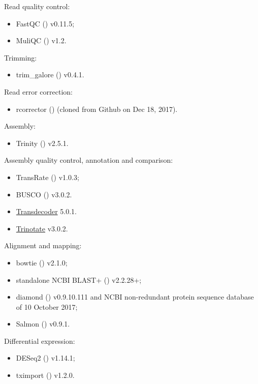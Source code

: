 \documentclass[12pt]{article}
\begin{document}
\noindent Read quality control: 
\begin{itemize}
\item FastQC (\cite{FastQC}) v0.11.5;
\item MuliQC (\cite{MultiQC}) v1.2.
\end{itemize}

\noindent Trimming:
\begin{itemize}
\item trim\_galore (\cite{trim_galore}) v0.4.1.
\end{itemize}

\noindent Read error correction:
\begin{itemize}
\item rcorrector (\cite{Song2015}) (cloned from Github on Dec 18, 2017). 
\end{itemize}

\noindent Assembly:
\begin{itemize}
\item Trinity (\cite{Grabherr2011}) v2.5.1.
\end{itemize}

\noindent Assembly quality control, annotation and comparison:
\begin{itemize}
\item TransRate (\cite{Smith-Unna2016}) v1.0.3;
\item BUSCO (\cite{Simao2015}) v3.0.2.
\item \href{http://transdecoder.github.io/}{Transdecoder} 5.0.1.
\item \href{https://trinotate.github.io/}{Trinotate} v3.0.2. 
\end{itemize}



\noindent Alignment and mapping:
\begin{itemize}
\item bowtie (\cite{Langmead2012}) v2.1.0;
\item standalone NCBI BLAST+ (\cite{Camacho2009}) v2.2.28+;
\item diamond (\cite{Buchfink2014}) v0.9.10.111 and NCBI non-redundant protein sequence database of 10 October 2017;
\item Salmon (\cite{Patro2017}) v0.9.1.
\end{itemize}

\noindent Differential expression:
\begin{itemize}
\item DESeq2 (\cite{Love2014}) v1.14.1;
\item tximport (\cite{Soneson2015}) v1.2.0.
\end{itemize}
\end{document}
